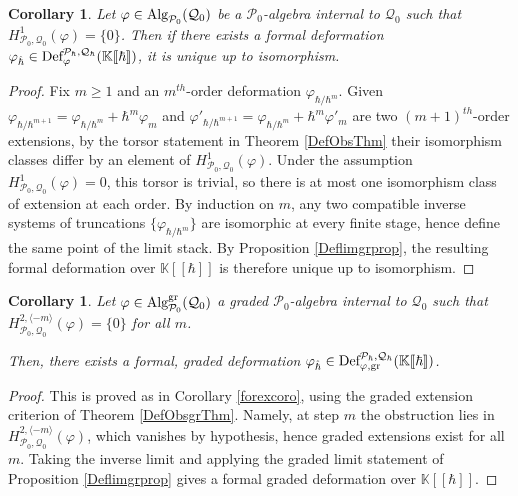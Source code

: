\documentclass[11pt]{amsart}
\numberwithin{equation}{section}
\newtheorem{coro}[theo]{Corollary}
\theoremstyle{definition}
\newcommand{\bb}{\mathbb}
\newcommand{\mc}{\mathcal}
\newcommand{\Def}{{\textup{Def}}}
\newcommand{\Ph}{{\mathcal{P}_\hbar}}
\newcommand{\Qh}{{\mathcal{Q}_\hbar}}
\newcommand{\fph}{{[\![\hbar]\!]}}
\newcommand{\gd}{{\textup{gr}}}
\newcommand{\K}{{\bb K}}
\newcommand{\Alg}{{\textup{Alg}}}
\newcommand{\0}{{\textbf{0}}}
\begin{document}
\begin{coro}\label{foruncoro} 
Let $\varphi\in \Alg_{\mc P_0}(\mc Q_0)$ be a $\mc P_0$-algebra internal to $\mc Q_0$ such that $H^{1}_{\mc P_0,\mc Q_0}(\varphi)=\{0\}$. Then if there exists a formal deformation $\varphi_{\hat{\hbar}}\in \Def_{\varphi}^{\Ph,\Qh}(\K\fph)$, it is unique up to isomorphism.
\end{coro}
\begin{proof}
Fix $m\ge 1$ and an $m^{th}$-order deformation $\varphi_{\hbar/\hbar^m}$. Given $\varphi_{\hbar/\hbar^{m+1}}=\varphi_{\hbar/\hbar^m}+\hbar^m\varphi_m$ and $\varphi'_{\hbar/\hbar^{m+1}}=\varphi_{\hbar/\hbar^m}+\hbar^m\varphi'_m$ are two $(m+1)^{th}$-order extensions, by the torsor statement in Theorem \ref{DefObsThm} their isomorphism classes differ by an element of $H^1_{\mc P_0,\mc Q_0}(\varphi)$. Under the assumption $H^1_{\mc P_0,\mc Q_0}(\varphi)=0$, this torsor is trivial, so there is at most one isomorphism class of extension at each order. By induction on $m$, any two compatible inverse systems of truncations $\{\varphi_{\hbar/\hbar^m}\}$ are isomorphic at every finite stage, hence define the same point of the limit stack. By Proposition \ref{Deflimgrprop}, the resulting formal deformation over $\K\fph$ is therefore unique up to isomorphism.
\end{proof}


\begin{coro}\label{forexgrcoro} 
Let $\varphi\in \Alg_{\mc P_0}^\gd(\mc Q_0)$ a graded $\mc P_0$-algebra internal to $\mc Q_0$ such that $H^{2,\langle -m \rangle}_{\mc P_0,\mc Q_0}(\varphi)=\{0\}$ for all $m$. 

Then, there exists a formal, graded deformation $\varphi_{\hat{\hbar}}\in \Def_{\varphi,\gd}^{\Ph,\Qh}(\K\fph)$.
\end{coro}
\begin{proof}
This is proved as in Corollary \ref{forexcoro}, using the graded extension criterion of Theorem \ref{DefObsgrThm}. Namely, at step $m$ the obstruction lies in $H^{2,\langle -m\rangle}_{\mc P_0,\mc Q_0}(\varphi)$, which vanishes by hypothesis, hence graded extensions exist for all
$m$. Taking the inverse limit and applying the graded limit statement of Proposition \ref{Deflimgrprop} gives a formal graded deformation over $\K\fph$.
\end{proof}
\end{document}
